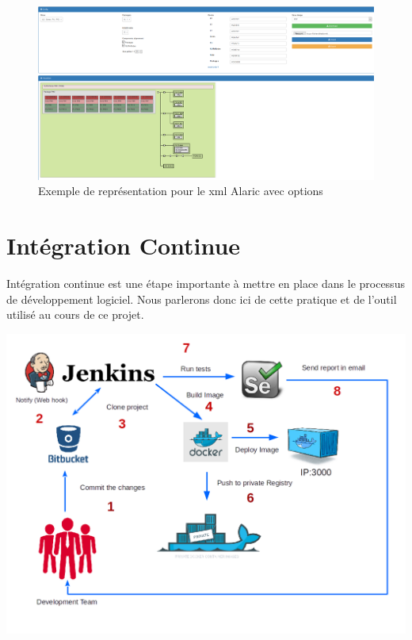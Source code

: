 \documentclass [a4paper,11pt]{article}
\begin{document}
\begin{itemize}
\begin{figure}[!h]
\centering
\includegraphics[scale=0.3]{img/alaric_modif.png}
\caption[Résultats]{Exemple de représentation pour le xml Alaric avec options}
\end{figure}

\end{itemize}

\newpage

\section{Intégration Continue}

Intégration continue est une étape importante à mettre en place dans le processus de développement logiciel. Nous parlerons donc ici de cette pratique et de l'outil utilisé au cours de ce projet.

\begin{center}
\includegraphics[scale=0.5]{img/ci.png}
\end{center}
\end{document}
